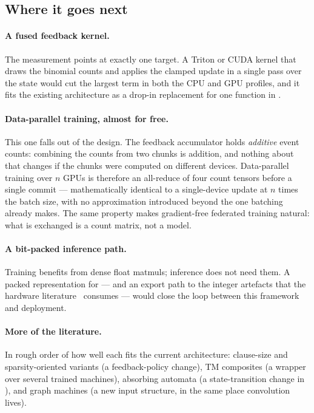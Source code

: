 \subsection{Where it goes next}

\paragraph{A fused feedback kernel.}
The measurement points at exactly one target. A Triton or CUDA kernel that draws the binomial
counts and applies the clamped update in a single pass over the state would cut the largest
term in both the CPU and GPU profiles, and it fits the existing architecture as a drop-in
replacement for one function in .

\paragraph{Data-parallel training, almost for free.}
This one falls out of the design. The feedback accumulator holds \emph{additive} event counts:
combining the counts from two chunks is addition, and nothing about that changes if the chunks
were computed on different devices. Data-parallel training over $n$ GPUs is therefore an
all-reduce of four count tensors before a single commit --- mathematically identical to a
single-device update at $n$ times the batch size, with no approximation introduced beyond the
one batching already makes. The same property makes gradient-free federated training natural:
what is exchanged is a count matrix, not a model.

\paragraph{A bit-packed inference path.}
Training benefits from dense float matmuls; inference does not need them. A packed
representation for  --- and an export path to the integer artefacts that the
hardware literature~ consumes --- would close the loop between this framework
and deployment.

\paragraph{More of the literature.}
In rough order of how well each fits the current architecture: clause-size and
sparsity-oriented variants (a feedback-policy change), TM composites (a wrapper over several
trained machines), absorbing automata (a state-transition change in ),
and graph machines (a new input structure, in the same place convolution lives).

